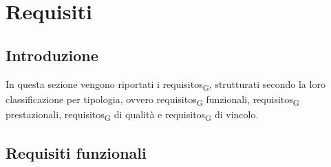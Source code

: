 \section{Requisiti}
\subsection{Introduzione}
In questa sezione vengono riportati i \glspl{requisito}\textsubscript{G}, strutturati secondo la loro classificazione per tipologia, ovvero \glspl{requisito}\textsubscript{G} funzionali, \glspl{requisito}\textsubscript{G} prestazionali, \glspl{requisito}\textsubscript{G} di qualità e \glspl{requisito}\textsubscript{G} di vincolo.
\subsection{Requisiti funzionali}
\renewcommand{\arraystretch}{1.5}
